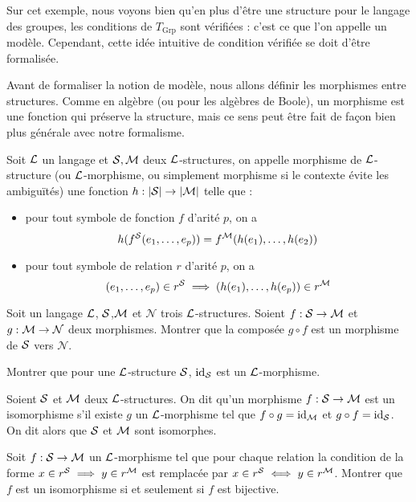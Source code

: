 Sur cet exemple, nous voyons bien qu'en plus d'être une structure pour le langage des groupes, les conditions de $T_{\mathrm{Grp}}$ sont vérifiées : c'est ce que l'on appelle un modèle. Cependant, cette idée intuitive de condition vérifiée se doit d'être formalisée.

Avant de formaliser la notion de modèle, nous allons définir les morphismes entre structures. Comme en algèbre (ou pour les algèbres de Boole), un morphisme est une fonction qui préserve la structure, mais ce sens peut être fait de façon bien plus générale avec notre formalisme.

\begin{defi}
    Soit $\mathcal L$ un langage et $\mathcal S,\mathcal M$ deux $\mathcal L$-structures, on appelle morphisme de $\mathcal L$-structure (ou $\mathcal L$-morphisme, ou simplement morphisme si le contexte évite les ambiguïtés) une fonction $h : |\mathcal S|\to|\mathcal M|$ telle que :
    \begin{itemize}[label=$\bullet$]
        \item pour tout symbole de fonction $f$ d'arité $p$, on a $$h(f^\mathcal S(e_1,\ldots,e_p)) = f^\mathcal M(h(e_1),\ldots,h(e_2))$$
        \item pour tout symbole de relation $r$ d'arité $p$, on a $$(e_1,\ldots,e_p)\in r^\mathcal S \implies (h(e_1),\ldots,h(e_p))\in r^\mathcal M$$
    \end{itemize}
\end{defi}

\begin{exo}
    Soit un langage $\mathcal L$, $\mathcal S$,$\mathcal M$ et $\mathcal N$ trois $\mathcal L$-structures. Soient $f : \mathcal S\to\mathcal M$ et $g : \mathcal M\to\mathcal N$ deux morphismes. Montrer que la composée $g\circ f$ est un morphisme de $\mathcal S$ vers $\mathcal N$.

    Montrer que pour une $\mathcal L$-structure $\mathcal S$, $\mathrm{id}_\mathcal S$ est un $\mathcal L$-morphisme.
\end{exo}

\begin{defi}[Isomorphisme]
    Soient $\mathcal S$ et $\mathcal M$ deux $\mathcal L$-structures. On dit qu'un morphisme $f : \mathcal S\to\mathcal M$ est un isomorphisme s'il existe $g$ un $\mathcal L$-morphisme tel que $f\circ g = \mathrm{id}_{\mathcal M}$ et $g\circ f = \mathrm{id}_\mathcal S$. On dit alors que $\mathcal S$ et $\mathcal M$ sont isomorphes.
\end{defi}

\begin{exo}
    Soit $f : \mathcal S\to\mathcal M$ un $\mathcal L$-morphisme tel que pour chaque relation la condition de la forme $x\in r^\mathcal S\implies y \in r^\mathcal M$ est remplacée par $x\in r^\mathcal S\iff y \in r^\mathcal M$. Montrer que $f$ est un isomorphisme si et seulement si $f$ est bijective.
\end{exo}

